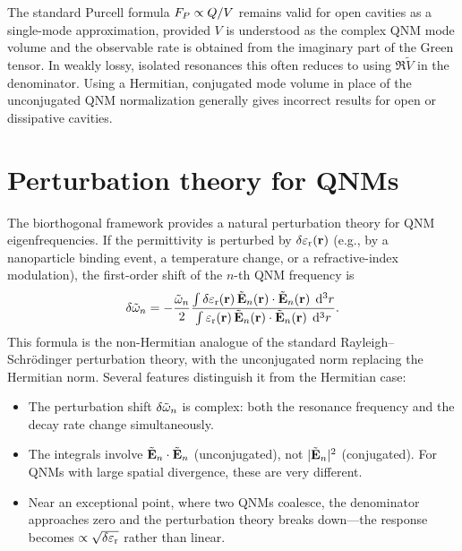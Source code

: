 \begin{takeaway}
The standard Purcell formula $F_P \propto Q/V$ remains valid for open
cavities as a single-mode approximation, provided $V$ is understood as
the complex QNM mode volume and the observable rate is obtained from the
imaginary part of the Green tensor. In weakly lossy, isolated resonances
this often reduces to using $\Re\tilde{V}$ in the denominator. Using a
Hermitian, conjugated mode volume in place of the unconjugated QNM
normalization generally gives incorrect results for open or dissipative
cavities.
\end{takeaway}


\section{Perturbation theory for QNMs}
\label{sec:qnm-perturbation}

The biorthogonal framework provides a natural perturbation theory for
QNM eigenfrequencies. If the permittivity is perturbed by
$\delta\varepsilon_{\mathrm{r}}(\mathbf{r})$ (e.g., by a nanoparticle binding event, a
temperature change, or a refractive-index modulation), the first-order
shift of the $n$-th QNM frequency is
\begin{equation}
 \delta\tilde{\omega}_n = -\frac{\tilde{\omega}_n}{2}
 \frac{\int \delta\varepsilon_{\mathrm{r}}(\mathbf{r})\,\tilde{\mathbf{E}}_n(\mathbf{r})\cdot\tilde{\mathbf{E}}_n(\mathbf{r})\;\mathop{}\!\mathrm{d}^3r}
 {\int \varepsilon_{\mathrm{r}}(\mathbf{r})\,\tilde{\mathbf{E}}_n(\mathbf{r})\cdot\tilde{\mathbf{E}}_n(\mathbf{r})\;\mathop{}\!\mathrm{d}^3r}.
 \label{eq:qnm-perturbation}
\end{equation}
This formula is the non-Hermitian analogue of the standard Rayleigh--Schr\"odinger
perturbation theory, with the unconjugated norm replacing the Hermitian
norm. Several features distinguish it from the Hermitian case:
\begin{itemize}
 \item The perturbation shift $\delta\tilde{\omega}_n$ is complex: both the
 resonance frequency and the decay rate change simultaneously.
 \item The integrals involve $\tilde{\mathbf{E}}_n \cdot \tilde{\mathbf{E}}_n$
 (unconjugated), not $|\tilde{\mathbf{E}}_n|^2$ (conjugated). For QNMs
 with large spatial divergence, these are very different.
 \item Near an exceptional point, where two QNMs coalesce, the
 denominator approaches zero and the perturbation theory breaks
 down---the response becomes $\propto\sqrt{\delta\varepsilon_{\mathrm{r}}}$ rather than
 linear.
\end{itemize}

